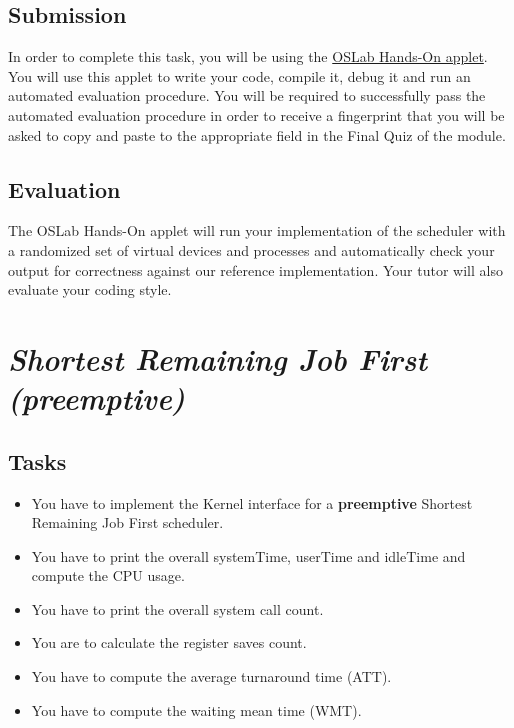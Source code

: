 \documentclass[11pt,a4paper]{scrreprt}
\begin{document}
\subsection{Submission}
In order to complete this task, you will be using the \href{https://oslab.unine.ch/portal/modules/3/}{OSLab Hands-On applet}. You will use this applet to write your code, compile it, debug it and run an automated evaluation procedure. You will be required to successfully pass the automated evaluation procedure in order to receive a fingerprint that you will be asked to copy and paste to the appropriate field in the Final Quiz of the module.

\subsection{Evaluation}
The OSLab Hands-On applet will run your implementation of the scheduler with a randomized set of virtual devices and processes and automatically check your output for correctness against our reference implementation. Your tutor will also evaluate your coding style.

\section{\textit{Shortest Remaining Job First (preemptive)}}
\subsection{Tasks}
\begin{itemize}
\item You have to implement the Kernel interface for a \textbf{preemptive} Shortest Remaining Job First scheduler.
\item You have to print the overall systemTime, userTime and idleTime and compute the CPU usage.
\item You have to print the overall system call count.
\item You are to calculate the register saves count.
\item You have to compute the average turnaround time (ATT).
\item You have to compute the waiting mean time (WMT).
\end{itemize}
\end{document}
